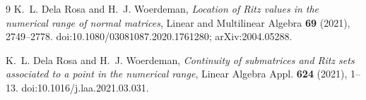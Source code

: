 \documentclass[11pt]{article}
\numberwithin{equation}{section}
\theoremstyle{definition}
\begin{document}
\begin{thebibliography}{9}
K.~L. Dela Rosa and H.~J. Woerdeman,
\emph{Location of Ritz values in the numerical range of normal matrices},
Linear and Multilinear Algebra \textbf{69} (2021), 2749--2778.
doi:10.1080/03081087.2020.1761280; arXiv:2004.05288.

K.~L. Dela Rosa and H.~J. Woerdeman,
\emph{Continuity of submatrices and Ritz sets associated to a point in the
numerical range}, Linear Algebra Appl. \textbf{624} (2021), 1--13.
doi:10.1016/j.laa.2021.03.031.
\end{thebibliography}
\end{document}
